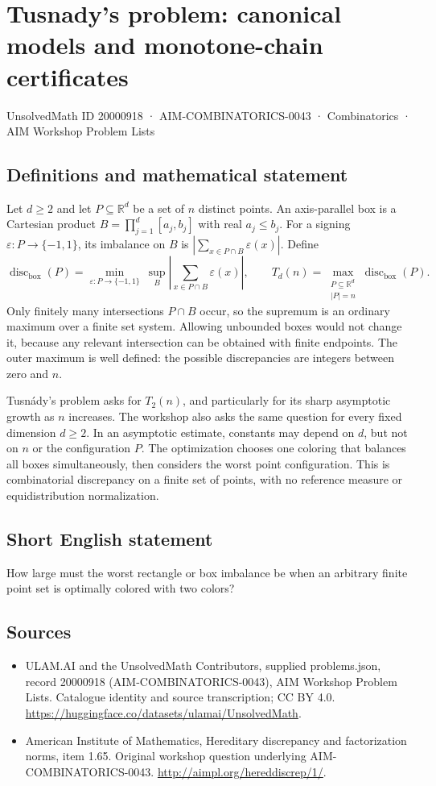 \documentclass[11pt,a4paper]{article}
\begin{document}
\section*{Tusnady's problem: canonical models and monotone-chain certificates}\label{20000918}
{\small UnsolvedMath ID 20000918 · AIM-COMBINATORICS-0043 · Combinatorics · AIM Workshop Problem Lists}
\subsection{Definitions and mathematical statement}
Let $d\ge2$ and let $P\subseteq\mathbb R^d$ be a set of $n$ distinct
points. An axis-parallel box is a Cartesian product
$B=\prod_{j=1}^d[a_j,b_j]$ with real $a_j\le b_j$.
For a signing $\varepsilon:P\to\{-1,1\}$, its imbalance on $B$ is
$|\sum_{x\in P\cap B}\varepsilon(x)|$. Define
\[
 \operatorname{disc}_{\mathrm{box}}(P)=
 \min_{\varepsilon:P\to\{-1,1\}}\ \sup_{B}
 \left|\sum_{x\in P\cap B}\varepsilon(x)\right|,
 \qquad
 T_d(n)=\max_{\substack{P\subseteq\mathbb R^d\\|P|=n}}
             \operatorname{disc}_{\mathrm{box}}(P).
\]
Only finitely many intersections $P\cap B$ occur, so the supremum is
an ordinary maximum over a finite set system. Allowing unbounded boxes
would not change it, because any relevant intersection can be obtained
with finite endpoints. The outer maximum is well defined: the possible
discrepancies are integers between zero and $n$.

Tusn\'ady's problem asks for $T_2(n)$, and particularly for its sharp
asymptotic growth as $n$ increases. The workshop also asks the same
question for every fixed dimension $d\ge2$. In an asymptotic estimate,
constants may depend on $d$, but not on $n$ or the configuration $P$.
The optimization chooses one coloring that balances all boxes
simultaneously, then considers the worst point configuration. This is
combinatorial discrepancy on a finite set of points, with no reference
measure or equidistribution normalization.
\subsection{Short English statement}
How large must the worst rectangle or box imbalance be when an arbitrary finite point set is optimally colored with two colors?
\subsection{Sources}
\begin{itemize}
\item[S1] ULAM.AI and the UnsolvedMath Contributors, supplied problems.json, record 20000918 (AIM-COMBINATORICS-0043), AIM Workshop Problem Lists. Catalogue identity and source transcription; CC BY 4.0.
\url{https://huggingface.co/datasets/ulamai/UnsolvedMath}.
\item[S2] American Institute of Mathematics, Hereditary discrepancy and factorization norms, item 1.65. Original workshop question underlying AIM-COMBINATORICS-0043.
\url{http://aimpl.org/hereddiscrep/1/}.
\end{itemize}
\end{document}
